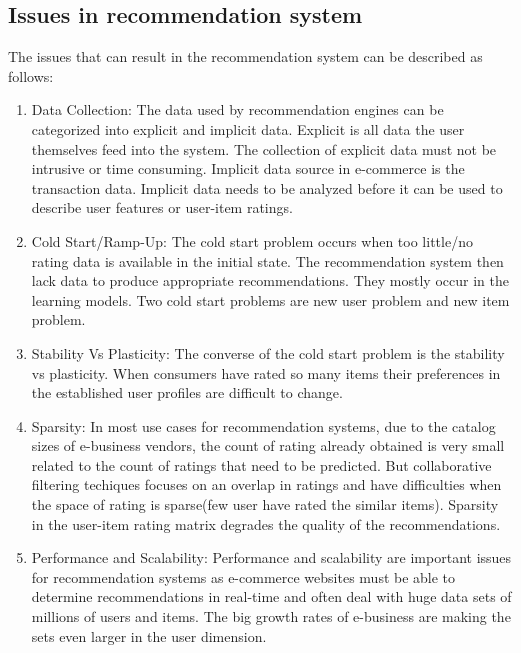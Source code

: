 \subsection{Issues in recommendation system}
The issues \cite{recommend} that can result in the recommendation system can be described as follows:
\begin{enumerate}
\item Data Collection: The data used by recommendation engines can be categorized into explicit and implicit data. Explicit is all data the user themselves feed into the system. The collection of explicit data must not be intrusive or time consuming. Implicit data source in e-commerce is the transaction data. Implicit data needs to be analyzed before it can be used to describe user features or user-item ratings.
\item Cold Start/Ramp-Up: The cold start problem occurs when too little/no rating data is available in the initial state. The recommendation system then lack data to produce appropriate recommendations. They mostly occur in the learning models. Two cold start problems are new user problem and new item problem.
\item Stability Vs Plasticity: The converse of the cold start problem is the stability vs plasticity. When consumers have rated so many items their preferences in the established user profiles are difficult to change. 
\item Sparsity: In most use cases for recommendation systems, due to the catalog sizes of e-business vendors, the count of rating already obtained is very small related to the count of ratings that need to be predicted. But collaborative filtering techiques focuses on an overlap in ratings and have difficulties when the space of rating is sparse(few user have rated the similar items). Sparsity in the user-item rating matrix degrades the quality of the recommendations.
\item Performance and Scalability: Performance and scalability are important issues for recommendation systems as e-commerce websites must be able to determine recommendations in real-time and often deal with huge data sets of millions of users and items. The big growth rates of e-business are making the sets even larger in the user dimension.

\end{enumerate}
